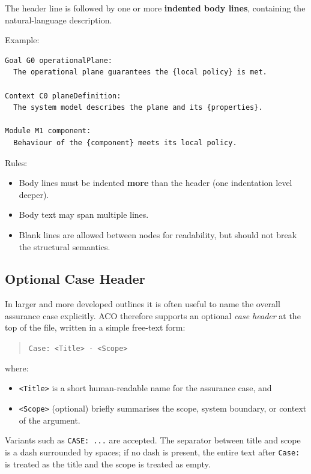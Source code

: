 \documentclass[11pt]{article}
\begin{document}
The header line is followed by one or more \textbf{indented body lines}, containing the natural-language description.

Example:
\begin{verbatim}
Goal G0 operationalPlane:
  The operational plane guarantees the {local policy} is met.

Context C0 planeDefinition:
  The system model describes the plane and its {properties}.

Module M1 component:
  Behaviour of the {component} meets its local policy.
\end{verbatim}

Rules:
\begin{itemize}[leftmargin=2em]
  \item Body lines must be indented \textbf{more} than the header (one indentation level deeper).
  \item Body text may span multiple lines.
  \item Blank lines are allowed between nodes for readability, but should not break the structural semantics.
\end{itemize}

\subsection{Optional Case Header}

In larger and more developed outlines it is often useful to name the overall assurance case explicitly.
ACO therefore supports an optional \emph{case header} at the top of the file, written
in a simple free-text form:

\begin{quote}
\texttt{Case: \textless Title\textgreater{} - \textless Scope\textgreater}
\end{quote}

where:
\begin{itemize}[leftmargin=2em]
  \item \texttt{\textless Title\textgreater{}} is a short human-readable name for the assurance case, and
  \item \texttt{\textless Scope\textgreater{}} (optional) briefly summarises the scope, system boundary,
        or context of the argument.
\end{itemize}

Variants such as \texttt{CASE: ...} are accepted. The separator between title and scope
is a dash surrounded by spaces; if no dash is present, the entire text after
\texttt{Case:} is treated as the title and the scope is treated as empty.
\end{document}
